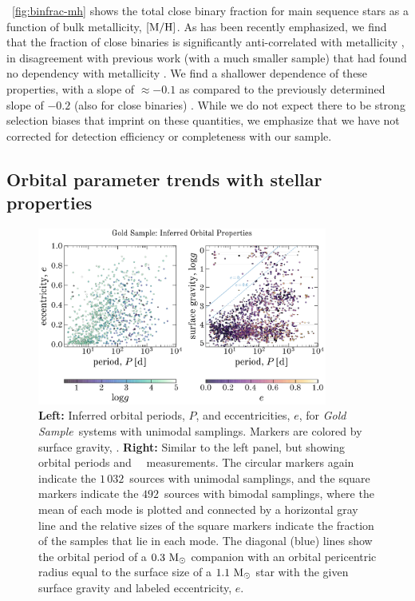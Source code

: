 \documentclass[modern]{aastex63}
\newcommand{\goldsample}{\textit{Gold Sample}}
\newcommand{\ngold}{\ensuremath{1\,032}}
\newcommand{\nbimodal}{\ensuremath{492}}
\begin{document}
\figurename~\ref{fig:binfrac-mh} shows the total close binary fraction for main
sequence stars as a function of bulk metallicity, ${[{\rm M}/{\rm H}]}$.
As has been recently emphasized, we find that the fraction of close binaries is
significantly anti-correlated with metallicity \citep{Moe:2019, El-Badry:2019a},
in disagreement with previous work (with a much smaller sample) that had
found no dependency with metallicity \citep{Jenkins:2015}.
We find a shallower dependence of these properties, with a slope of $\approx
-0.1$ as compared to the previously determined slope of $-0.2$ (also for close
binaries) \citep{Moe:2019}.
While we do not expect there to be strong selection biases that imprint on these
quantities, we emphasize that we have not corrected for detection efficiency or
completeness with our sample.


\subsection{Orbital parameter trends with stellar properties}
\label{sec:gold-sample}

\begin{figure}[!t]
    \begin{center}
    \includegraphics[width=0.85\textwidth]{Plogg_Pe.pdf}
    \end{center}
    \caption{%
    \textbf{Left:} Inferred orbital periods, $P$, and eccentricities, $e$, for
    \goldsample\ systems with unimodal samplings.
    Markers are colored by surface gravity, \logg.
    \textbf{Right:} Similar to the left panel, but showing orbital periods and
    \apogee\ \logg\ measurements.
    The circular markers again indicate the \ngold\ sources with unimodal
    samplings, and the square markers indicate the \nbimodal\ sources with
    bimodal samplings, where the mean of each mode is plotted and connected by a
    horizontal gray line and the relative sizes of the square markers indicate
    the fraction of the samples that lie in each mode.
    The diagonal (blue) lines show the orbital period of a $0.3~\mathrm{M}_\odot$ companion
    with an orbital pericentric radius equal to the surface size of a
    $1.1~\mathrm{M}_\odot$ star with the given surface gravity and labeled eccentricity,
    $e$.
    \label{fig:Plogg}
    }
\end{figure}
\end{document}

